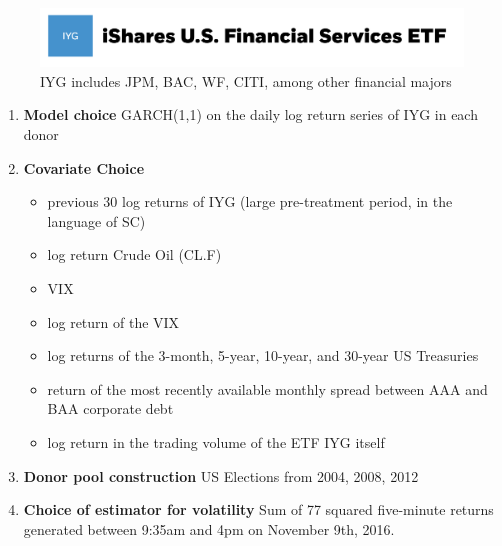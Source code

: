 \documentclass[9pt]{beamer}
\theoremstyle{definition}
\begin{document}
    \begin{frame}
        \begin{figure}[H]
            \begin{center}
              \includegraphics[scale=.2]{iyg.png}
              \caption{IYG includes JPM, BAC, WF, CITI, among other financial majors}
              \end{center}
            \end{figure}
    \begin{enumerate}
        \item \textbf{Model choice} GARCH(1,1) on the daily log return series of IYG in each donor
    
        \item \textbf{Covariate Choice} 
        \begin{itemize}
            \item previous 30 log returns of IYG (large pre-treatment period, in the language of SC)
            \item log return Crude Oil (CL.F)
            \item VIX
            \item log return of the VIX
            \item log returns of the 3-month, 5-year, 10-year, and 30-year US Treasuries
            \item return of the most recently available monthly spread between AAA and BAA corporate debt
            \item log return in the trading volume of the ETF IYG itself
        \end{itemize}
    
        \item \textbf{Donor pool construction} US Elections from 2004, 2008, 2012
    
        \item \textbf{Choice of estimator for volatility} Sum of 77 squared five-minute returns generated between 9:35am and 4pm on November 9th, 2016.
    \end{enumerate} 
    
    \end{frame}
    
\end{document}
